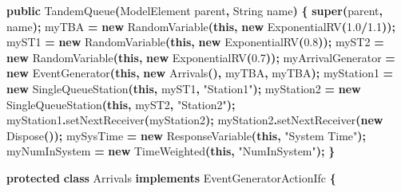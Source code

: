 \documentclass[
]{book}
\newenvironment{Shaded}{\begin{snugshade}}{\end{snugshade}}
\newcommand{\BuiltInTok}[1]{#1}
\newcommand{\FloatTok}[1]{\textcolor[rgb]{0.00,0.00,0.81}{#1}}
\newcommand{\FunctionTok}[1]{\textcolor[rgb]{0.00,0.00,0.00}{#1}}
\newcommand{\KeywordTok}[1]{\textcolor[rgb]{0.13,0.29,0.53}{\textbf{#1}}}
\newcommand{\NormalTok}[1]{#1}
\newcommand{\OperatorTok}[1]{\textcolor[rgb]{0.81,0.36,0.00}{\textbf{#1}}}
\newcommand{\StringTok}[1]{\textcolor[rgb]{0.31,0.60,0.02}{#1}}
\theoremstyle{definition}
\theoremstyle{definition}
\theoremstyle{definition}
\theoremstyle{definition}
\theoremstyle{remark}
\begin{document}
\begin{Shaded}
\begin{Highlighting}[]
    \KeywordTok{public} \FunctionTok{TandemQueue}\OperatorTok{(}\NormalTok{ModelElement parent}\OperatorTok{,} \BuiltInTok{String}\NormalTok{ name}\OperatorTok{)} \OperatorTok{\{}
        \KeywordTok{super}\OperatorTok{(}\NormalTok{parent}\OperatorTok{,}\NormalTok{ name}\OperatorTok{);}
\NormalTok{        myTBA }\OperatorTok{=} \KeywordTok{new} \FunctionTok{RandomVariable}\OperatorTok{(}\KeywordTok{this}\OperatorTok{,} \KeywordTok{new} \FunctionTok{ExponentialRV}\OperatorTok{(}\FloatTok{1.0}\OperatorTok{/}\FloatTok{1.1}\OperatorTok{));}
\NormalTok{        myST1 }\OperatorTok{=} \KeywordTok{new} \FunctionTok{RandomVariable}\OperatorTok{(}\KeywordTok{this}\OperatorTok{,} \KeywordTok{new} \FunctionTok{ExponentialRV}\OperatorTok{(}\FloatTok{0.8}\OperatorTok{));}
\NormalTok{        myST2 }\OperatorTok{=} \KeywordTok{new} \FunctionTok{RandomVariable}\OperatorTok{(}\KeywordTok{this}\OperatorTok{,} \KeywordTok{new} \FunctionTok{ExponentialRV}\OperatorTok{(}\FloatTok{0.7}\OperatorTok{));}
\NormalTok{        myArrivalGenerator }\OperatorTok{=} \KeywordTok{new} \FunctionTok{EventGenerator}\OperatorTok{(}\KeywordTok{this}\OperatorTok{,} \KeywordTok{new} \FunctionTok{Arrivals}\OperatorTok{(),}\NormalTok{ myTBA}\OperatorTok{,}\NormalTok{ myTBA}\OperatorTok{);}
\NormalTok{        myStation1 }\OperatorTok{=} \KeywordTok{new} \FunctionTok{SingleQueueStation}\OperatorTok{(}\KeywordTok{this}\OperatorTok{,}\NormalTok{ myST1}\OperatorTok{,} \StringTok{"Station1"}\OperatorTok{);}
\NormalTok{        myStation2 }\OperatorTok{=} \KeywordTok{new} \FunctionTok{SingleQueueStation}\OperatorTok{(}\KeywordTok{this}\OperatorTok{,}\NormalTok{ myST2}\OperatorTok{,} \StringTok{"Station2"}\OperatorTok{);}
\NormalTok{        myStation1}\OperatorTok{.}\FunctionTok{setNextReceiver}\OperatorTok{(}\NormalTok{myStation2}\OperatorTok{);}
\NormalTok{        myStation2}\OperatorTok{.}\FunctionTok{setNextReceiver}\OperatorTok{(}\KeywordTok{new} \FunctionTok{Dispose}\OperatorTok{());}
\NormalTok{        mySysTime }\OperatorTok{=} \KeywordTok{new} \FunctionTok{ResponseVariable}\OperatorTok{(}\KeywordTok{this}\OperatorTok{,} \StringTok{"System Time"}\OperatorTok{);}
\NormalTok{        myNumInSystem }\OperatorTok{=} \KeywordTok{new} \FunctionTok{TimeWeighted}\OperatorTok{(}\KeywordTok{this}\OperatorTok{,} \StringTok{"NumInSystem"}\OperatorTok{);}
    \OperatorTok{\}}

    \KeywordTok{protected} \KeywordTok{class}\NormalTok{ Arrivals }\KeywordTok{implements}\NormalTok{ EventGeneratorActionIfc }\OperatorTok{\{}


\end{Highlighting}
\end{Shaded}
\end{document}
